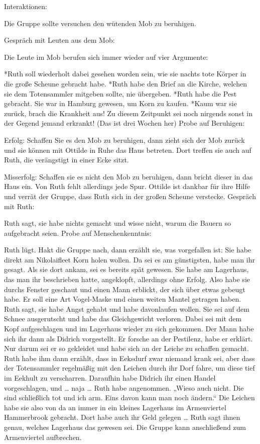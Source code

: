 Interaktionen:

Die Gruppe sollte versuchen den wütenden Mob zu beruhigen.

Gespräch mit Leuten aus dem Mob:

Die Leute im Mob berufen sich immer wieder auf vier Argumente:

*Ruth soll wiederholt dabei gesehen worden sein, wie sie nachts tote Körper in die große Scheune gebracht habe.
*Ruth habe den Brief an die Kirche, welchen sie dem Totensammler mitgeben sollte, nie übergeben.
*Ruth habe die Pest gebracht. Sie war in Hamburg gewesen, um Korn zu kaufen.
*Kaum war sie zurück, brach die Krankheit aus! Zu diesem Zeitpunkt sei noch nirgends sonst in der Gegend jemand erkrankt! (Das ist drei Wochen her)
Probe auf Beruhigen:

Erfolg: Schaffen Sie es den Mob zu beruhigen, dann zieht sich der Mob zurück und sie können mit Ottilde in Ruhe das Haus betreten.
Dort treffen sie auch auf Ruth, die verängstigt in
einer Ecke sitzt.

Misserfolg: Schaffen sie es nicht den Mob zu beruhigen, dann bricht dieser in das Haus ein.
Von Ruth fehlt allerdings jede Spur. Ottilde ist dankbar für ihre Hilfe und verrät der Gruppe,
dass Ruth sich in der großen Scheune verstecke.
Gespräch mit Ruth:

Ruth sagt, sie habe nichts gemacht und wisse nicht, warum die Bauern so aufgebracht seien.
Probe auf Menschenkenntnis:

Ruth lügt. Hakt die Gruppe nach, dann erzählt sie, was vorgefallen ist:
Sie habe direkt am Nikolaifleet Korn holen wollen. Da sei es am günstigsten, habe man ihr gesagt.
Als sie dort ankam, sei es bereits spät gewesen. Sie habe am Lagerhaus, das man ihr beschrieben hatte, angeklopft, allerdings ohne Erfolg.
Also habe sie durchs Fenster geschaut und einen Mann erblickt, der sich über etwas gebeugt habe. Er soll eine Art Vogel-Maske und einen weiten Mantel getragen haben.
Ruth sagt, sie habe Angst gehabt und habe davonlaufen wollen. Sie sei auf dem Schnee ausgerutscht und habe das Gleichgewicht verloren.
Dabei sei mit dem Kopf aufgeschlagen und im Lagerhaus wieder zu sich gekommen. Der Mann habe sich ihr dann als Didrich vorgestellt. Er forsche an der Pestilenz, habe er erklärt.
Nur darum sei er so gekleidet und habe sich an der Leiche zu schaffen gemacht. Ruth habe ihm dann erzählt, dass in Eeksdurf zwar niemand krank sei, aber dass der Totensammler regelmäßig mit den Leichen durch ihr Dorf fahre, um diese tief im Eekhult zu verscharren.
Daraufhin habe Didrich ihr einen Handel vorgeschlagen, und … naja … Ruth habe angenommen. „Wieso auch nicht. Die sind schließlich tot und ich arm. Eins davon kann man noch ändern.“
Die Leichen habe sie also von da an immer in ein kleines Lagerhaus im Armenviertel Hammerbrook gebracht. Dort habe auch ihr Geld gelegen …
Ruth sagt ihnen genau, welches Lagerhaus das gewesen sei. Die Gruppe kann anschließend zum Armenviertel aufbrechen.

